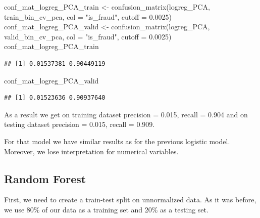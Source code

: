 \documentclass[
]{report}
\newenvironment{Shaded}{\begin{snugshade}}{\end{snugshade}}
\newcommand{\AttributeTok}[1]{\textcolor[rgb]{0.77,0.63,0.00}{#1}}
\newcommand{\FloatTok}[1]{\textcolor[rgb]{0.00,0.00,0.81}{#1}}
\newcommand{\FunctionTok}[1]{\textcolor[rgb]{0.00,0.00,0.00}{#1}}
\newcommand{\NormalTok}[1]{#1}
\newcommand{\OtherTok}[1]{\textcolor[rgb]{0.56,0.35,0.01}{#1}}
\newcommand{\SpecialCharTok}[1]{\textcolor[rgb]{0.00,0.00,0.00}{#1}}
\newcommand{\StringTok}[1]{\textcolor[rgb]{0.31,0.60,0.02}{#1}}
\begin{document}
\begin{Shaded}
\begin{Highlighting}[]
\NormalTok{conf\_mat\_logreg\_PCA\_train }\OtherTok{\textless{}{-}} 
  \FunctionTok{confusion\_matrix}\NormalTok{(logreg\_PCA, train\_bin\_cv\_pca, }\AttributeTok{col =} \StringTok{"is\_fraud"}\NormalTok{, }\AttributeTok{cutoff =} \FloatTok{0.0025}\NormalTok{)}
\NormalTok{conf\_mat\_logreg\_PCA\_valid }\OtherTok{\textless{}{-}} 
  \FunctionTok{confusion\_matrix}\NormalTok{(logreg\_PCA, valid\_bin\_cv\_pca, }\AttributeTok{col =} \StringTok{"is\_fraud"}\NormalTok{, }\AttributeTok{cutoff =} \FloatTok{0.0025}\NormalTok{)}
\NormalTok{conf\_mat\_logreg\_PCA\_train}
\end{Highlighting}
\end{Shaded}

\begin{verbatim}
## [1] 0.01537381 0.90449119
\end{verbatim}

\begin{Shaded}
\begin{Highlighting}[]
\NormalTok{conf\_mat\_logreg\_PCA\_valid}
\end{Highlighting}
\end{Shaded}

\begin{verbatim}
## [1] 0.01523636 0.90937640
\end{verbatim}

As a result we get on training dataset precision = 0.015, recall = 0.904
and on testing dataset precision = 0.015, recall = 0.909.

For that model we have similar results as for the previous logistic
model. Moreover, we lose interpretation for numerical variables.

\hypertarget{random-forest}{%
\subsection{Random Forest}\label{random-forest}}

First, we need to create a train-test split on unnormalized data. As it
was before, we use 80\% of our data as a training set and 20\% as a
testing set.

\begin{Shaded}
\end{Shaded}
\end{document}
